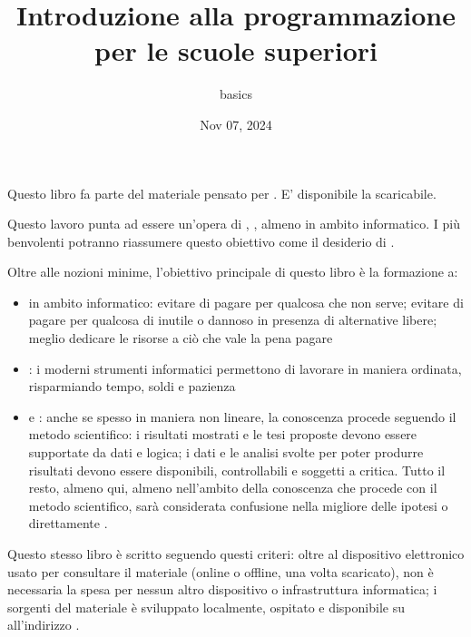 \documentclass[letterpaper,10pt,english]{jupyterBook}
\title{Introduzione alla programmazione per le scuole superiori}
\date{Nov 07, 2024}
\author{basics}
\begin{document}
\pagestyle{empty}
\sphinxmaketitle
\pagestyle{plain}
\sphinxtableofcontents
\pagestyle{normal}
\label{\detokenize{intro::doc}}


\sphinxAtStartPar
Questo libro fa parte del materiale pensato per . E’ disponibile la  scaricabile.

\sphinxAtStartPar
{} Questo lavoro punta ad essere un’opera di  ,   , almeno in ambito informatico. I più benvolenti potranno riassumere questo obiettivo come il desiderio di .

\sphinxAtStartPar
Oltre alle nozioni minime, l’obiettivo principale di questo libro è la formazione a:
\begin{itemize}
\item {} 
\sphinxAtStartPar
{} in ambito informatico: evitare di pagare per qualcosa che non serve; evitare di pagare per qualcosa di inutile o dannoso in presenza di alternative libere; meglio dedicare le risorse a ciò che vale la pena pagare

\item {} 
\sphinxAtStartPar
{}: i moderni strumenti informatici permettono di lavorare in maniera ordinata, risparmiando tempo, soldi e pazienza

\item {} 
\sphinxAtStartPar
{} e : anche se spesso in maniera non lineare, la conoscenza procede seguendo il metodo scientifico: i risultati mostrati e le tesi proposte devono essere supportate da dati e logica; i dati e le analisi svolte per poter produrre risultati devono essere disponibili, controllabili e soggetti a critica. Tutto il resto, almeno qui, almeno nell’ambito della conoscenza che procede con il metodo scientifico, sarà considerata confusione nella migliore delle ipotesi o direttamente .

\end{itemize}

\sphinxAtStartPar
Questo stesso libro è scritto seguendo questi criteri: oltre al dispositivo elettronico usato per consultare il materiale (online o offline, una volta scaricato), non è necessaria la spesa per nessun altro dispositivo o infrastruttura informatica; i sorgenti del materiale è sviluppato localmente, ospitato e disponibile su  all’indirizzo .
\end{document}
